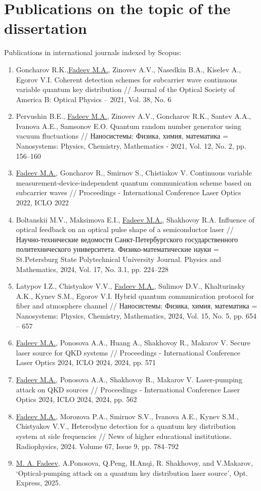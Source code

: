 \section*{Publications on the topic of the dissertation}

Publications in international journals indexed by Scopus:\\
\begin{enumerate}
    \item Goncharov R.K.,\underline{Fadeev M.A.}, Zinovev A.V., Nasedkin B.A., Kiselev A., Egorov V.I. Coherent detection schemes for subcarrier wave continuous variable quantum key distribution // Journal of the Optical Society of America B: Optical Physics -- 2021, Vol. 38, No. 6
    \item Pervushin B.E., \underline{Fadeev M.A.}, Zinovev A.V., Goncharov R.K., Santev A.A., Ivanova A.E., Samsonov E.O. Quantum random number generator using vacuum fluctuations // Наносистемы: Физика, химия, математика = Nanosystems: Physics, Chemistry, Mathematics - 2021, Vol. 12, No. 2, pp. 156--160
    \item \underline{Fadeev M.A.}, Goncharov R., Smirnov S., Chistiakov V. Continuous variable measurement-device-independent quantum communication scheme based on subcarrier waves // Proceedings - International Conference Laser Optics 2022, ICLO 2022
    \item Boltanskii M.V., Maksimova E.I., \underline{Fadeev M.A.}, Shakhovoy R.A. Influence of optical feedback on an optical pulse shape of a semiconductor laser // Научно-технические ведомости Санкт-Петербургского государственного политехнического университета. Физико-математические науки = St.Petersburg State Polytechnical University Journal. Physics and Mathematics, 2024, Vol. 17, No. 3.1, pp. 224--228
    \item Latypov I.Z., Chistyakov V.V., \underline{Fadeev M.A.}, Sulimov D.V., Khalturinsky A.K., Kynev S.M., Egorov V.I. Hybrid quantum communication protocol for fiber and atmosphere channel // Наносистемы: Физика, химия, математика = Nanosystems: Physics, Chemistry, Mathematics, 2024, Vol. 15, No. 5, pp. 654 -- 657
    \item \underline{Fadeev M.A.}, Ponosova A.A., Huang A., Shakhovoy R., Makarov V. Secure laser source for QKD systems // Proceedings - International Conference Laser Optics 2024, ICLO 2024, 2024, pp. 571
    \item \underline{Fadeev M.A.}, Ponosova A.A., Shakhovoy R., Makarov V. Laser-pumping attack on QKD sources // Proceedings - International Conference Laser Optics 2024, ICLO 2024, 2024, pp. 562
\item \underline{Fadeev M.A.}, Morozova P.A., Smirnov S.V., Ivanova A.E., Kynev S.M., Chistyakov V.V., Heterodyne detection for a quantum key distribution system at side frequencies // News of higher educational institutions. Radiophysics, 2024. Volume 67, Issue 9, pp. 784--792    \item \underline{M. A. Fadeev}, A.Ponosova, Q.Peng, H.Anqi, R. Shakhovoy, and V.Makarov, `Optical-pumping attack on a quantum key distribution laser source', Opt. Express, 2025.

\end{enumerate}
